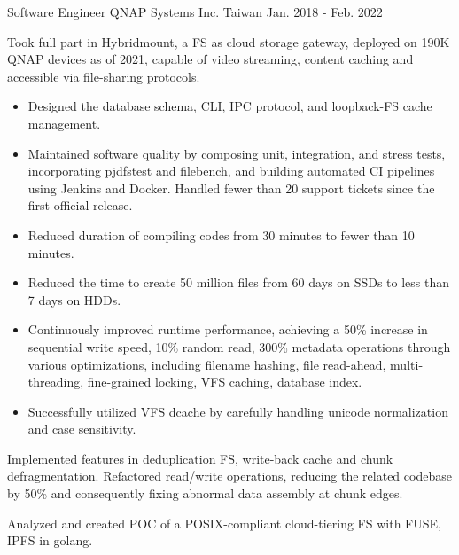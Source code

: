 \begin{cventries}
  \cventry
    {Software Engineer} %
    {QNAP Systems Inc.} %
    {Taiwan} %
    {Jan. 2018 - Feb. 2022} %
    {
      \begin{cvitems} %
        \item Took full part in Hybridmount, a FS as cloud storage gateway,
          deployed on 190K QNAP devices as of 2021, capable of video streaming,
          content caching and accessible via file-sharing protocols.
        \begin{itemize}
          \item Designed the database schema, CLI, IPC protocol, and loopback-FS
            cache management.
          \item Maintained software quality by composing unit, integration, and
            stress tests, incorporating pjdfstest and filebench, and building
            automated CI pipelines using Jenkins and Docker. Handled fewer than
            20 support tickets since the first official release.
          \item Reduced duration of compiling codes from 30 minutes to fewer
            than 10 minutes.
          \item Reduced the time to create 50 million files from 60 days
            on SSDs to less than 7 days on HDDs.
          \item Continuously improved runtime performance, achieving a 50\%
            increase in sequential write speed, 10\% random read, 300\% metadata
            operations through various optimizations, including filename
            hashing, file read-ahead, multi-threading, fine-grained locking, VFS
            caching, database index.
          \item Successfully utilized VFS dcache by carefully handling unicode
            normalization and case sensitivity.
        \end{itemize}
        \item Implemented features in deduplication FS, write-back cache
          and chunk defragmentation. Refactored read/write operations, reducing
          the related codebase by 50\% and consequently fixing abnormal data
          assembly at chunk edges.
        \item Analyzed and created POC of a POSIX-compliant cloud-tiering FS
          with FUSE, IPFS in golang.
      \end{cvitems}
    }

\end{cventries}
